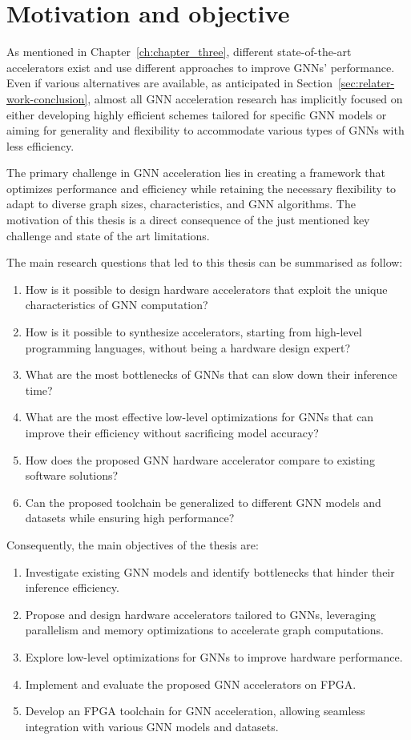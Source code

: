 \section{Motivation and objective}
\label{sec:motivation}%

As mentioned in Chapter~\ref{ch:chapter_three}, different state-of-the-art accelerators exist and use different approaches to improve GNNs' performance.
Even if various alternatives are available, as anticipated in Section~\ref{sec:relater-work-conclusion}, almost all GNN acceleration research has implicitly focused on either developing highly efficient schemes tailored for specific GNN models or aiming for generality and flexibility to accommodate various types of GNNs with less efficiency.

The primary challenge in GNN acceleration lies in creating a framework that optimizes performance and efficiency while retaining the necessary flexibility to adapt to diverse graph sizes, characteristics, and GNN algorithms.
The motivation of this thesis is a direct consequence of the just mentioned key challenge and state of the art limitations.

The main research questions that led to this thesis can be summarised as follow:
\begin{enumerate}
    \item How is it possible to design hardware accelerators that exploit the unique characteristics of GNN computation?
    \item How is it possible to synthesize accelerators, starting from high-level programming languages, without being a hardware design expert?
    \item What are the most bottlenecks of GNNs that can slow down their inference time?
    \item What are the most effective low-level optimizations for GNNs that can improve their efficiency without sacrificing model accuracy?
    \item How does the proposed GNN hardware accelerator compare to existing software solutions?
    \item Can the proposed toolchain be generalized to different GNN models and datasets while ensuring high performance?
\end{enumerate}


Consequently, the main objectives of the thesis are:
\begin{enumerate}
    \item Investigate existing GNN models and identify bottlenecks that hinder their inference efficiency.
    \item Propose and design hardware accelerators tailored to GNNs, leveraging parallelism and memory optimizations to accelerate graph computations.
    \item Explore low-level optimizations for GNNs to improve hardware performance.
    \item Implement and evaluate the proposed GNN accelerators on FPGA.
    \item Develop an FPGA toolchain for GNN acceleration, allowing seamless integration with various GNN models and datasets.
\end{enumerate}


